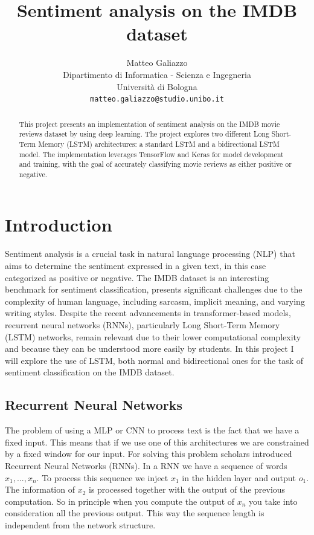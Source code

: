 \documentclass{article}
\title{Sentiment analysis on the IMDB dataset}
\author{
 Matteo Galiazzo \\
  Dipartimento di Informatica - Scienza e Ingegneria\\
  Università di Bologna\\
  \texttt{matteo.galiazzo@studio.unibo.it} \\
}
\begin{document}
\maketitle
\begin{abstract}
This project presents an implementation of sentiment analysis on the IMDB movie reviews dataset by using deep learning.
The project explores two different Long Short-Term Memory (LSTM) architectures: a standard LSTM and a bidirectional LSTM model.
The implementation leverages TensorFlow and Keras for model development and training, with the goal of accurately classifying movie reviews as either positive or negative.
\end{abstract}


\tableofcontents

\section{Introduction}

Sentiment analysis is a crucial task in natural language processing (NLP) that aims to determine the sentiment expressed in a given text, in this case categorized as positive or negative.
The IMDB dataset is an interesting benchmark for sentiment classification, presents significant challenges due to the complexity of human language, including sarcasm, implicit meaning, and varying writing styles.
Despite the recent advancements in transformer-based models, recurrent neural networks (RNNs), particularly Long Short-Term Memory (LSTM) networks, remain relevant due to their lower computational complexity and because they can be understood more easily by students.
In this project I will explore the use of LSTM, both normal and bidirectional ones for the task of sentiment classification on the IMDB dataset.

\subsection{Recurrent Neural Networks}

The problem of using a MLP or CNN to process text is the fact that we have a fixed input.
This means that if we use one of this architectures we are constrained by a fixed window for our input.
For solving this problem scholars introduced Recurrent Neural Networks (RNNs).
In a RNN we have a sequence of words $x_1, ..., x_n$.
To process this sequence we inject $x_1$ in the hidden layer and output $o_1$.
The information of $x_2$ is processed together with the output of the previous computation.
So in principle when you compute the output of $x_n$ you take into consideration all the previous output.
This way the sequence length is independent from the network structure.
\end{document}
